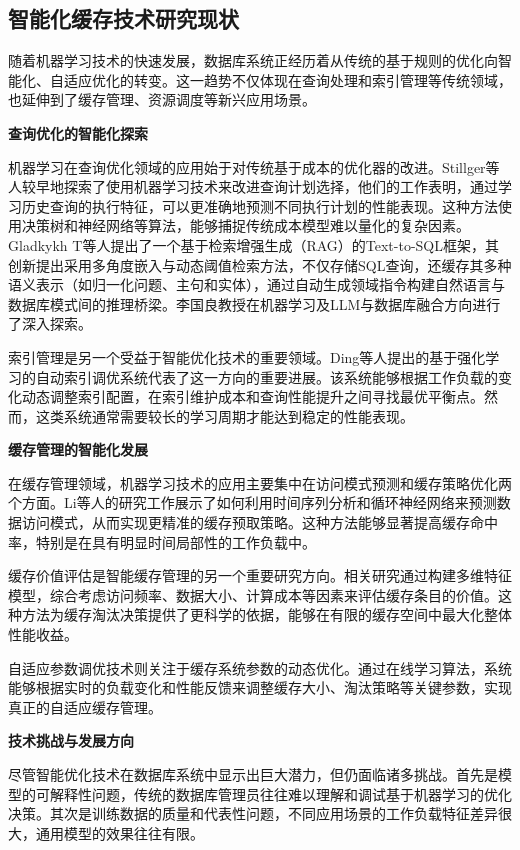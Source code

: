 \subsection{智能化缓存技术研究现状}

随着机器学习技术的快速发展，数据库系统正经历着从传统的基于规则的优化向智能化、自适应优化的转变。这一趋势不仅体现在查询处理和索引管理等传统领域，也延伸到了缓存管理、资源调度等新兴应用场景。

\textbf{查询优化的智能化探索}

机器学习在查询优化领域的应用始于对传统基于成本的优化器的改进。Stillger等人较早地探索了使用机器学习技术来改进查询计划选择\cite{c18}，他们的工作表明，通过学习历史查询的执行特征，可以更准确地预测不同执行计划的性能表现。这种方法使用决策树和神经网络等算法，能够捕捉传统成本模型难以量化的复杂因素。Gladkykh T等人提出了一个基于检索增强生成（RAG）的Text-to-SQL框架\cite{c71}，其创新提出采用多角度嵌入与动态阈值检索方法，不仅存储SQL查询，还缓存其多种语义表示（如归一化问题、主句和实体），通过自动生成领域指令构建自然语言与数据库模式间的推理桥梁。李国良教授在机器学习\cite{c84,c85}及LLM\cite{c86,c87}与数据库融合方向进行了深入探索。

索引管理是另一个受益于智能优化技术的重要领域。Ding等人提出的基于强化学习的自动索引调优系统\cite{c19}代表了这一方向的重要进展。该系统能够根据工作负载的变化动态调整索引配置，在索引维护成本和查询性能提升之间寻找最优平衡点。然而，这类系统通常需要较长的学习周期才能达到稳定的性能表现。

\textbf{缓存管理的智能化发展}

在缓存管理领域，机器学习技术的应用主要集中在访问模式预测和缓存策略优化两个方面。Li等人的研究工作展示了如何利用时间序列分析和循环神经网络来预测数据访问模式\cite{c20}，从而实现更精准的缓存预取策略。这种方法能够显著提高缓存命中率，特别是在具有明显时间局部性的工作负载中。

缓存价值评估是智能缓存管理的另一个重要研究方向。相关研究通过构建多维特征模型，综合考虑访问频率、数据大小、计算成本等因素来评估缓存条目的价值\cite{c21}。这种方法为缓存淘汰决策提供了更科学的依据，能够在有限的缓存空间中最大化整体性能收益。

自适应参数调优技术则关注于缓存系统参数的动态优化\cite{c22}。通过在线学习算法，系统能够根据实时的负载变化和性能反馈来调整缓存大小、淘汰策略等关键参数，实现真正的自适应缓存管理。

\textbf{技术挑战与发展方向}

尽管智能优化技术在数据库系统中显示出巨大潜力，但仍面临诸多挑战。首先是模型的可解释性问题，传统的数据库管理员往往难以理解和调试基于机器学习的优化决策。其次是训练数据的质量和代表性问题，不同应用场景的工作负载特征差异很大，通用模型的效果往往有限。

